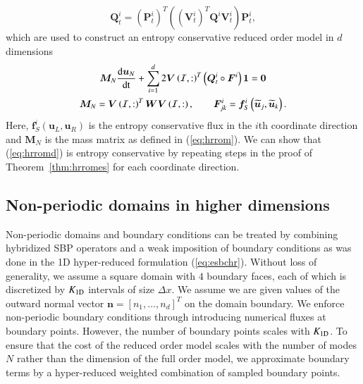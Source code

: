 \documentclass[preprint,10pt]{elsarticle}
\theoremstyle{definition}
\theoremstyle{lemma}
\theoremstyle{theorem}
\theoremstyle{assumption}
\renewcommand{\tilde}{\widetilde}
\newcommand{\td}[2]{\frac{{\rm d}#1}{{\rm d}{\rm #2}}}
\newcommand{\LRp}[1]{\left( #1 \right)}
\newcommand{\LRs}[1]{\left[ #1 \right]}
\begin{document}
\[
\bm{Q}_t^i = \LRp{\bm{P}^i_t}^T\LRp{\LRp{\bm{V}^i_t}^T\bm{Q}^i\bm{V}^i_t}\bm{P}^i_t,
\]
which are used to construct an entropy conservative reduced order model in $d$ dimensions
\begin{gather}
\bm{M}_N\td{\bm{u}_N}{t} + \sum_{i=1}^d 2\bm{V}\LRp{\mathcal{I},:}^T\LRp{\bm{Q}^i_t \circ \bm{F}^i}\bm{1} = \bm{0} \label{eq:hrromd}\\
\bm{M}_N = \bm{V}\LRp{\mathcal{I},:}^T\bm{W}\bm{V}\LRp{\mathcal{I},:}, \qquad \bm{F}^i_{jk} = \bm{f}^i_S\LRp{\tilde{\bm{u}}_j,\tilde{\bm{u}}_k}.\nonumber
\end{gather}
Here, $\bm{f}^i_S\LRp{\bm{u}_L,\bm{u}_R}$ is the entropy conservative flux in the $i$th coordinate direction and $\bm{M}_N$ is the mass matrix as defined in (\ref{eq:hrrom}).  We can show that (\ref{eq:hrromd}) is entropy conservative by repeating steps in the proof of Theorem~\ref{thm:hrromes} for each coordinate direction.  

\subsection{Non-periodic domains in higher dimensions}

Non-periodic domains and boundary conditions can be treated by combining hybridized SBP operators and a weak imposition of boundary conditions as was done in the 1D hyper-reduced formulation (\ref{eq:esbchr}).  Without loss of generality, we assume a square domain with $4$ boundary faces, each of which is discretized by $K_{\rm 1D}$ intervals of size $\Delta x$.  We assume we are given values of the outward normal vector $\bm{n} = \LRs{n_1, \ldots, n_d}^T$ on the domain boundary.  We enforce non-periodic boundary conditions through introducing numerical fluxes at boundary points.  However, the number of boundary points scales with $K_{\rm 1D}$.  To ensure that the cost of the reduced order model scales with the number of modes $N$ rather than the dimension of the full order model, we approximate boundary terms by a hyper-reduced weighted combination of sampled boundary points.  
\end{document}
